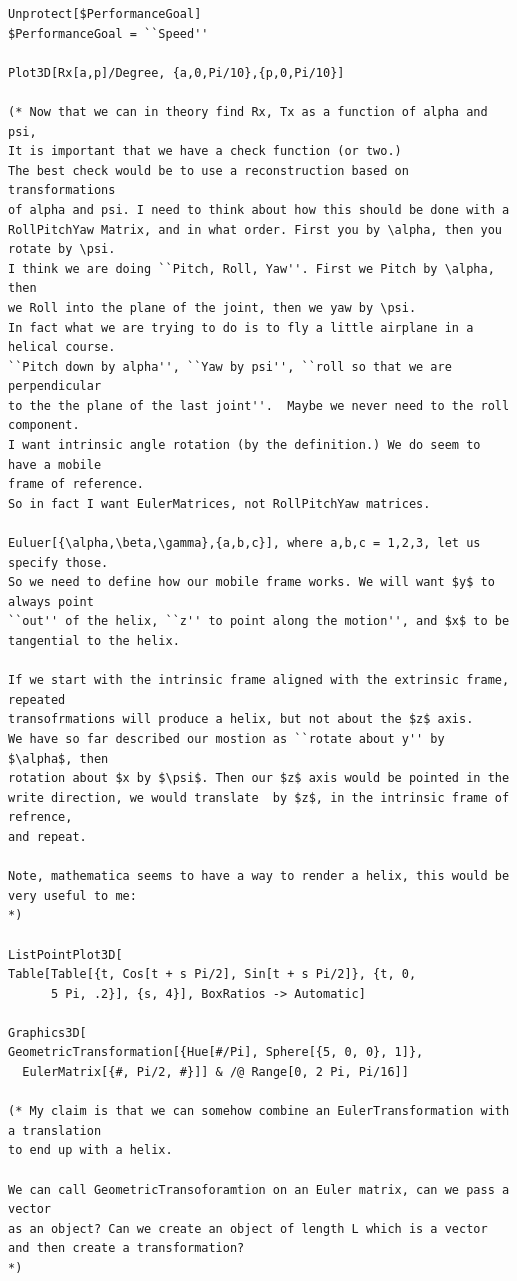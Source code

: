 \documentclass[11pt]{article}
\begin{document}
{\begin{verbatim}
Unprotect[$PerformanceGoal]
$PerformanceGoal = ``Speed''

Plot3D[Rx[a,p]/Degree, {a,0,Pi/10},{p,0,Pi/10}]

(* Now that we can in theory find Rx, Tx as a function of alpha and psi,
It is important that we have a check function (or two.)
The best check would be to use a reconstruction based on transformations
of alpha and psi. I need to think about how this should be done with a
RollPitchYaw Matrix, and in what order. First you by \alpha, then you rotate by \psi.
I think we are doing ``Pitch, Roll, Yaw''. First we Pitch by \alpha, then
we Roll into the plane of the joint, then we yaw by \psi.
In fact what we are trying to do is to fly a little airplane in a helical course.
``Pitch down by alpha'', ``Yaw by psi'', ``roll so that we are perpendicular
to the the plane of the last joint''.  Maybe we never need to the roll component.
I want intrinsic angle rotation (by the definition.) We do seem to have a mobile
frame of reference.
So in fact I want EulerMatrices, not RollPitchYaw matrices.

Euluer[{\alpha,\beta,\gamma},{a,b,c}], where a,b,c = 1,2,3, let us specify those.
So we need to define how our mobile frame works. We will want $y$ to always point
``out'' of the helix, ``z'' to point along the motion'', and $x$ to be
tangential to the helix.

If we start with the intrinsic frame aligned with the extrinsic frame, repeated
transofrmations will produce a helix, but not about the $z$ axis.
We have so far described our mostion as ``rotate about y'' by $\alpha$, then
rotation about $x by $\psi$. Then our $z$ axis would be pointed in the
write direction, we would translate  by $z$, in the intrinsic frame of refrence,
and repeat.

Note, mathematica seems to have a way to render a helix, this would be very useful to me:
*)

ListPointPlot3D[
Table[Table[{t, Cos[t + s Pi/2], Sin[t + s Pi/2]}, {t, 0, 
      5 Pi, .2}], {s, 4}], BoxRatios -> Automatic]

Graphics3D[
GeometricTransformation[{Hue[#/Pi], Sphere[{5, 0, 0}, 1]}, 
  EulerMatrix[{#, Pi/2, #}]] & /@ Range[0, 2 Pi, Pi/16]]

(* My claim is that we can somehow combine an EulerTransformation with a translation
to end up with a helix.

We can call GeometricTransoforamtion on an Euler matrix, can we pass a vector
as an object? Can we create an object of length L which is a vector
and then create a transformation?
*)


\end{verbatim}}
\end{document}
